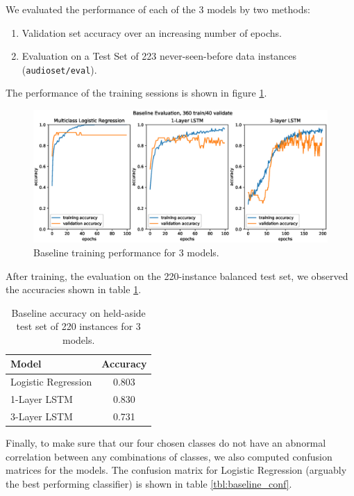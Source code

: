 \documentclass{article}
\begin{document}
We evaluated the performance of each of the 3 models by two methods:
\begin{enumerate}
\item Validation set accuracy over an increasing number of epochs.
\item Evaluation on a Test Set of 223 never-seen-before data instances (\texttt{audioset/eval}).
\end{enumerate}

The performance of the training sessions is shown in figure \ref{fig:baseline_train}.
\begin{figure}[]
	\centering
	\includegraphics[width=1.25\textwidth]{Baseline400.eps}  
	\caption{Baseline training performance for 3 models.}
	\label{fig:baseline_train}
\end{figure}

After training, the evaluation on  the 220-instance balanced test set, we observed the accuracies shown in table \ref{tbl:baseline_acc}.
\begin{table}[] 
\caption{Baseline accuracy on held-aside test set of 220 instances for 3 models.}
\label{tbl:baseline_acc}
\centering
\begin{tabular}{lc} 
\toprule
\hline
Model & Accuracy \\ 
\midrule
Logistic Regression & 0.803 \\
1-Layer LSTM & 0.830 \\ 
3-Layer LSTM & 0.731 \\ 
\bottomrule
\end{tabular}
\end{table}

Finally, to make sure that our four chosen classes do not have an abnormal correlation between any combinations of classes, we also computed confusion matrices for the models. The confusion matrix for Logistic Regression (arguably the best performing classifier) is shown in table \ref{tbl:baseline_conf}.
\end{document}
